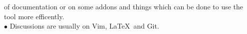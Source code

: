 \documentclass[10pt,a4paper,oneside]{article}
\begin{document}
\begin{minipage}[t]{0.33\textwidth}
\begin{adjustwidth}{7pt}{0pt}
{            of documentation or on some addons and things which can be done to use the tool more efficently.}\\
            {\footnotesize $\bullet$ Discussions are usually on Vim, \LaTeX \  and Git. }
        \end{adjustwidth}
        \vspace{10pt}
        \begin{comment}
            \begin{tabular}{c}
            \textbf{\normalsize A\textsc{ffiliations}}\\
            \end{tabular}
            \begin{adjustwidth}{7pt}{0pt}
                {\footnotesize \textbf{International Society of Technical Education(09-12)} -Participated in several events and
                organised a few events.}\\
                {\footnotesize \textbf{Computer Society of India(09-12)} -Member since 2009,organised few workshops and
            tutorial sessions.}
                \vspace{0pt}\\
            \end{adjustwidth} 
        \end{comment}
    \end{minipage}
\end{document}

